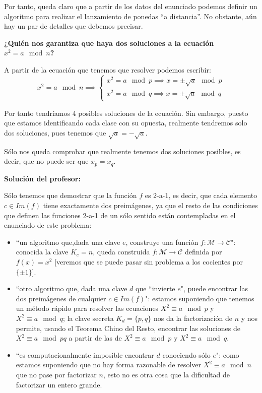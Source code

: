 \begin{problem}[8]
Por tanto, queda claro que a partir de los datos del enunciado podemos definir un algoritmo para realizar el lanzamiento de ponedas ``a distancia''. No obstante, aún hay un par de detalles que debemos precisar.

\textbf{¿Quién nos garantiza que haya dos soluciones a la ecuación $x^2=a \mod n$?}

A partir de la ecuación que tenemos que resolver podemos escribir:
\[x^2 = a \mod n \implies \left\{\begin{array}{l} x^2=a \mod p \implies x = \pm \sqrt{a} \mod p\\ x^2=a \mod q \implies x = \pm \sqrt{a} \mod q\end{array}\right. \]

Por tanto tendríamos 4 posibles soluciones de la ecuación. Sin embargo, puesto que estamos identificando cada clase con su opuesta, realmente tendremos solo dos soluciones, pues tenemos que $\sqrt{a} = -\sqrt{a}$.

Sólo nos queda comprobar que realmente tenemos dos soluciones posibles, es decir, que no puede ser que $x_p=x_q$.

\textbf{Solución del profesor:}

Sólo tenemos que demostrar que la función $f$ es 2-a-1, es decir, que cada elemento $c\in Im(f)$ tiene exactamente dos preimágenes, ya que el resto de las condiciones que definen las funciones 2-a-1 de un sólo sentido están contempladas en el enunciado de este problema:

\begin{itemize}

\item ``un algoritmo
que,dada una clave $e$, construye una función $f:\mathcal
M\longrightarrow\mathcal C$": conocida la clave $K_e=n$, queda construida $f:  \mathcal{M}\to  \mathcal{C}$ definida
por $f(x)=x^2$ [veremos que se puede pasar sin problema a los cocientes por $\{\pm1\}$].

\item ``otro algoritmo que, dada una clave $d$ que ``invierte
$e$", puede encontrar las dos preimágenes de cualquier $c\in
Im(f)$": estamos suponiendo que tenemos un método rápido para resolver las ecuaciones $X^2\equiv a \mod p$ y  $X^2\equiv a \mod q$; la clave secreta $K_d=\{p,q\}$ nos da la factorización de $n$ y nos permite, usando el Teorema Chino del Resto, encontrar las soluciones de $X^2\equiv a \mod pq$ a partir de las de $X^2\equiv a \mod p$ y $X^2\equiv a \mod q$.

\item ``es computacionalmente imposible encontrar $d$ conociendo sólo $e$": como estamos suponiendo que no hay forma razonable de resolver   $X^2\equiv a \mod n$ que no pase por
factorizar $n$, esto no es otra cosa que la dificultad de factorizar un entero grande.


\end{itemize}
\end{problem}
